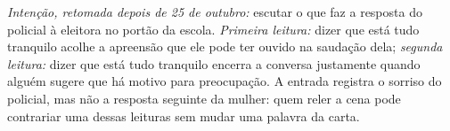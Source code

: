\textit{Intenção, retomada depois de 25 de outubro:} escutar o que faz a resposta do policial à eleitora no portão da escola. \textit{Primeira leitura:} dizer que está tudo tranquilo acolhe a apreensão que ele pode ter ouvido na saudação dela; \textit{segunda leitura:} dizer que está tudo tranquilo encerra a conversa justamente quando alguém sugere que há motivo para preocupação. A entrada registra o sorriso do policial, mas não a resposta seguinte da mulher: quem reler a cena pode contrariar uma dessas leituras sem mudar uma palavra da carta.
